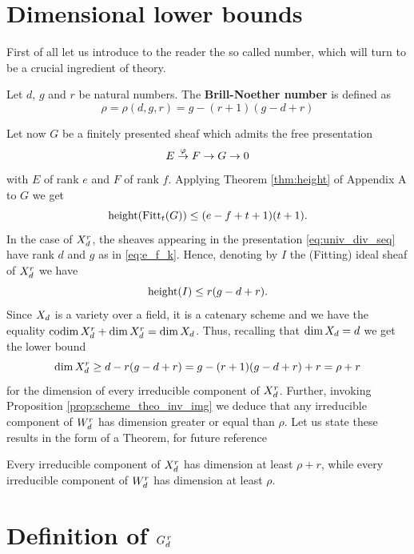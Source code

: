 \section{Dimensional lower bounds}\label{sec:lower_bound}
	First of all let us introduce to the reader the so called \BN number, which will turn to be a crucial ingredient of \BN theory.
	\begin{defi}
		Let $d$, $g$ and $r$ be natural numbers. The \textbf{Brill-Noether number} is defined as
		$$\rho = \rho(d,g,r) = g - (r+1)(g-d+r)$$
	\end{defi}
	\vspace{1em}
	Let now $G$ be a finitely presented sheaf which admits the free presentation
	$$ E\overset{\varphi}\to F \to G\to 0 $$
	with $E$ of rank $e$ and $F$ of rank $f$. Applying Theorem \ref{thm:height} of Appendix A to $G$ we get
	$$ \operatorname{height} (\operatorname{Fitt}_t(G)) \leq (e-f+t+1)(t+1). $$
	In the case of $X_d^r$, the sheaves appearing in the presentation \eqref{eq:univ_div_seq} have rank $d$ and $g$ as in \eqref{eq:e_f_k}. Hence, denoting by $I$ the (Fitting) ideal sheaf of $X_d^r$ we have
	$$ \operatorname{height} (I) \leq r(g-d+r). $$
	Since $X_d$ is a variety over a field, it is a catenary scheme and we have the equality $ \operatorname{codim} X_d^r + \dim X_d^r = \dim X_d $. Thus, recalling that $\dim X_d = d$ we get the lower bound
	$$ \dim X_d^r \geq d - r(g-d+r) = g-(r+1)(g-d+r) + r = \rho + r $$
	for the dimension of every irreducible component of  $X_d^r$. Further, invoking Proposition \ref{prop:scheme_theo_inv_img} we deduce that any irreducible component of $W_d^r$ has dimension greater or equal than $\rho $. Let us state these results in the form of a Theorem, for future reference
	\begin{theo}\label{thm:lowerbounds}
		Every irreducible component of $X_d^r$ has dimension at least $ \rho + r$, while every irreducible component of $W_d^r$ has dimension at least $ \rho $.
	\end{theo}


\section{Definition of $G_d^{\,r}$}

